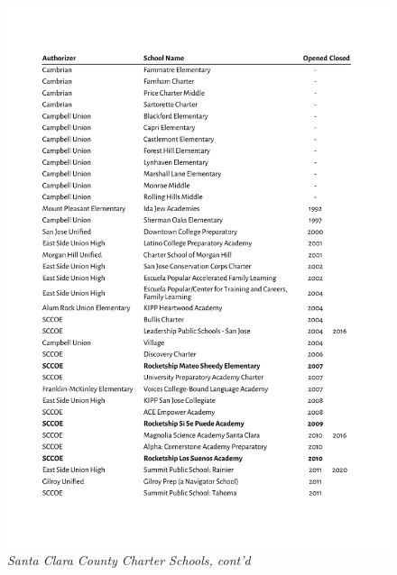 \begin{figure}[htb]
  \caption*{\textit{Santa Clara County Charter Schools, cont'd}}\label{fig:SCCcharters}
  \includegraphics[page=2,width=\textwidth]{Santa_Clara_County_Charter_Schools}
\end{figure}

